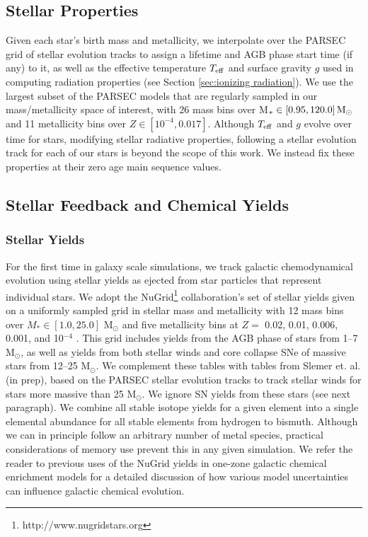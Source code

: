 \documentclass[twocolumn]{aastex61}
\begin{document}
\subsection{Stellar Properties}
\label{sec:properties}
Given each star's birth mass and metallicity, we interpolate over the PARSEC grid of stellar evolution tracks \citep{Bressan2012} to assign a lifetime and AGB phase start time (if any) to it, as well as the effective temperature $T_{\rm eff}$ and surface gravity $g$ used in computing radiation properties (see Section \ref{sec:ionizing radiation}). We use the largest subset of the PARSEC models that are regularly sampled in our mass/metallicity space of interest, with 26 mass bins over M$_{*} \in \left[0.95, 120.0 \right] {\rm M_{\odot}}$ and 11 metallicity bins over $Z \in \left[10^{-4}, 0.017 \right]$. Although $T_{\rm eff}$ and $g$ evolve over time for stars, modifying stellar radiative properties, following a stellar evolution track for each of our stars is beyond the scope of this work. We instead fix these properties at their zero age main sequence values.

\subsection{Stellar Feedback and Chemical Yields}

\subsubsection{Stellar Yields}
\label{sec:yields}
For the first time in galaxy scale simulations, we track galactic chemodynamical evolution using stellar yields as ejected from star particles that represent individual stars. We adopt the NuGrid\footnote{http://www.nugridstars.org} collaboration's set of stellar yields given on a uniformly sampled grid in stellar mass and metallicity with 12 mass bins over $M_{*} \in \left[1.0, 25.0\right]$ M$_{\odot}$ and five metallicity bins at $Z =$ 0.02, 0.01, 0.006, 0.001, and 10$^{-4}$ \citep{Pignatari2016, Ritter2017}. This grid includes yields from the AGB phase of stars from 1--7 M$_{\odot}$, as well as yields from both stellar winds and core collapse SNe of massive stars from 12--25 M$_{\odot}$. We complement these tables with tables from Slemer et. al. (in prep), based on the PARSEC stellar evolution tracks \citep{Bressan2012, Tang2014} to track stellar winds for stars more massive than 25 M$_{\odot}$. We ignore SN yields from these stars (see next paragraph). We combine all stable isotope yields for a given element into a single elemental abundance for all stable elements from hydrogen to bismuth. Although we can in principle follow an arbitrary number of metal species, practical considerations of memory use prevent this in any given simulation. We refer the reader to previous uses of the NuGrid yields in one-zone galactic chemical enrichment models \citep{Cote2016,  Cote2016_feb,Cote2017} for a detailed discussion of how various model uncertainties can influence galactic chemical evolution.
\end{document}
